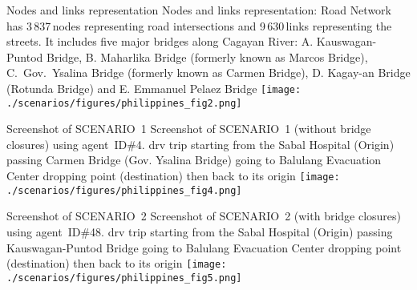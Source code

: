 \createfigure%
{Nodes and links representation}%
{Nodes and links representation: Road Network has 3\,837\,nodes representing road intersections and 9\,630\,links representing the streets. It includes five major bridges along Cagayan River: A. Kauswagan-Puntod Bridge, B. Maharlika Bridge (formerly known as Marcos Bridge), C.\ Gov.\ Ysalina Bridge (formerly known as Carmen Bridge), D. Kagay-an Bridge (Rotunda Bridge) and E. Emmanuel Pelaez Bridge}%
{\label{fig:philippines_fig2}}%
{\texttt{[image: ./scenarios/figures/philippines\_fig2.png]}}%
{}

\createfigure%
{Screenshot of SCENARIO~1}%
{Screenshot of SCENARIO~1 (without bridge closures) using agent~ID\#4. \protect\gls{drv} trip starting from the Sabal Hospital (Origin) passing Carmen Bridge (Gov. Ysalina Bridge) going to Balulang Evacuation Center dropping point (destination) then back to its origin}%
{\label{fig:philippines_fig4}}%
{\texttt{[image: ./scenarios/figures/philippines\_fig4.png]}}%
{}

\createfigure%
{Screenshot of SCENARIO~2}%
{Screenshot of SCENARIO~2 (with bridge closures) using agent~ID\#48. \protect\gls{drv} trip starting from the Sabal Hospital (Origin) passing Kauswagan-Puntod Bridge going to Balulang Evacuation Center dropping point (destination) then back to its origin}%
{\label{fig:philippines_fig5}}%
{\texttt{[image: ./scenarios/figures/philippines\_fig5.png]}}%
{}







 
